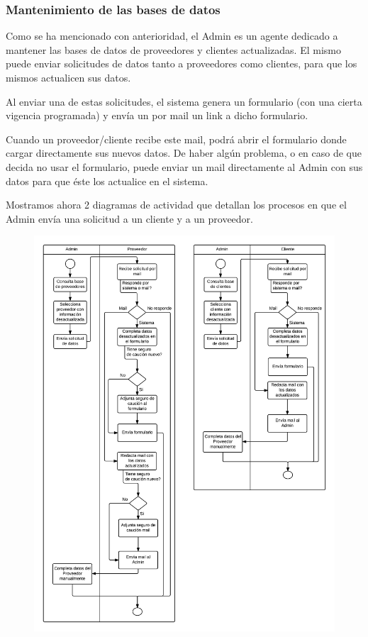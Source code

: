	\subsubsection{Mantenimiento de las bases de datos}
Como se ha mencionado con anterioridad, el Admin es un agente dedicado 
a mantener las bases de datos de proveedores y clientes actualizadas. 
El mismo puede enviar solicitudes de datos tanto a proveedores como clientes, 
para que los mismos actualicen sus datos. 

Al enviar una de estas solicitudes, 
el sistema genera un formulario (con una cierta vigencia programada) y envía 
un por mail un link a dicho formulario. 

Cuando un proveedor/cliente recibe este mail, podrá abrir el formulario 
donde cargar directamente sus nuevos datos. De haber algún problema, o en caso 
de que decida no usar el formulario, puede enviar un mail directamente al Admin 
con sus datos para que éste los actualice en el sistema. 

Mostramos ahora 2 diagramas de actividad que detallan los procesos en que 
el Admin envía una solicitud a un cliente y a un proveedor. 

\begin{figure}[H]
\centering
\includegraphics[width=0.8\linewidth]{diag/nuevos/da-admin.png}
\label{da-admin}
\end{figure}


